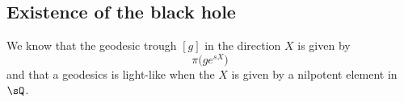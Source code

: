 \subsection{Existence of the black hole}
%
\label{LONGSubSecExistenceTrouNoir}

We know that the geodesic trough $[g]$ in the direction $X$ is given by
\begin{equation}
	\pi\big( g e^{sX} \big)
\end{equation}
and that a geodesics is light-like when the  $X$ is given by a nilpotent element in $\sQ$\cite{lcTNAdS}.


\newcommand{\CaptionFigDTIYKkP}{We are looking at a geodesics issued from one point of the line $[\SO(2)]=\{ e^{xq_0}\}_{x\in\mathopen[ 0 , 2\pi [}$. Here, $E(w)=q_0+w_1q_1+w_2q_2+\sum_{k\geq 3}w_kq_k$ with $\sum_{k}w_k^2=1$.}


